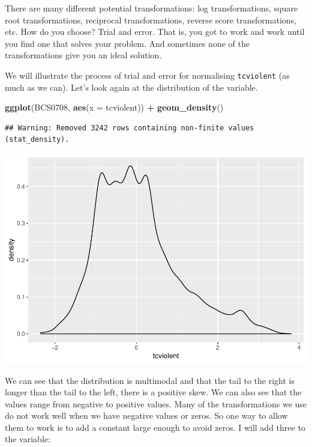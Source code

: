 \documentclass[]{book}
\newenvironment{Shaded}{\begin{snugshade}}{\end{snugshade}}
\newcommand{\DataTypeTok}[1]{\textcolor[rgb]{0.13,0.29,0.53}{#1}}
\newcommand{\KeywordTok}[1]{\textcolor[rgb]{0.13,0.29,0.53}{\textbf{#1}}}
\newcommand{\NormalTok}[1]{#1}
\newcommand{\OperatorTok}[1]{\textcolor[rgb]{0.81,0.36,0.00}{\textbf{#1}}}
\newcommand{\StringTok}[1]{\textcolor[rgb]{0.31,0.60,0.02}{#1}}
\theoremstyle{definition}
\theoremstyle{definition}
\theoremstyle{definition}
\theoremstyle{remark}
\begin{document}
There are many different potential transformations: log transformations,
square root transformations, reciprocal transformations, reverse score
transformations, etc. How do you choose? Trial and error. That is, you
got to work and work until you find one that solves your problem. And
sometimes none of the transformations give you an ideal solution.

We will illustrate the process of trial and error for normalising
\texttt{tcviolent} (as much as we can). Let's look again at the
distribution of the variable.

\begin{Shaded}
\begin{Highlighting}[]
\KeywordTok{ggplot}\NormalTok{(BCS0708, }\KeywordTok{aes}\NormalTok{(}\DataTypeTok{x =}\NormalTok{ tcviolent)) }\OperatorTok{+}\StringTok{ }
\StringTok{  }\KeywordTok{geom_density}\NormalTok{()}
\end{Highlighting}
\end{Shaded}

\begin{verbatim}
## Warning: Removed 3242 rows containing non-finite values (stat_density).
\end{verbatim}

\includegraphics{06-hypothesis_testing_files/figure-latex/unnamed-chunk-17-1.pdf}

We can see that the distribution is multimodal and that the tail to the
right is longer than the tail to the left, there is a positive skew. We
can also see that the values range from negative to positive values.
Many of the transformations we use do not work well when we have
negative values or zeros. So one way to allow them to work is to add a
constant large enough to avoid zeros. I will add three to the variable:
\end{document}
